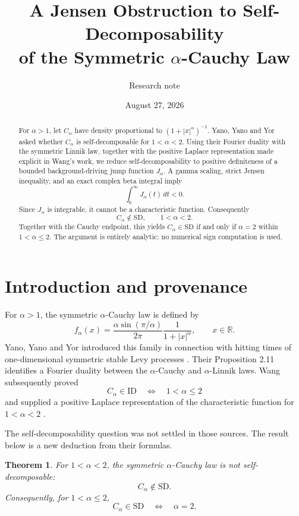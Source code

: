 \documentclass[11pt]{article}
\title{\bfseries A Jensen Obstruction to Self-Decomposability\\
of the Symmetric \texorpdfstring{$\alpha$}{alpha}-Cauchy Law}
\author{Research note}
\date{August 27, 2026}
\newtheorem{theorem}{Theorem}[section]
\theoremstyle{remark}
\newcommand{\R}{\mathbb{R}}
\newcommand{\SD}{\mathrm{SD}}
\newcommand{\ID}{\mathrm{ID}}
\begin{document}
\maketitle

\begin{abstract}
For $\alpha>1$, let $C_\alpha$ have density proportional to
$(1+|x|^\alpha)^{-1}$.  Yano, Yano and Yor asked whether $C_\alpha$
is self-decomposable for $1<\alpha<2$.  Using their Fourier duality
with the symmetric Linnik law, together with the positive Laplace
representation made explicit in Wang's work, we reduce
self-decomposability to positive definiteness of a bounded
background-driving jump function $J_\alpha$.  A gamma scaling,
strict Jensen inequality, and an exact complex beta integral imply
\[
  \int_0^\infty J_\alpha(t)\,dt<0.
\]
Since $J_\alpha$ is integrable, it cannot be a characteristic
function.  Consequently
\[
  C_\alpha\notin\SD,\qquad 1<\alpha<2.
\]
Together with the Cauchy endpoint, this yields
$C_\alpha\in\SD$ if and only if $\alpha=2$ within
$1<\alpha\leq2$.  The argument is entirely analytic; no numerical
sign computation is used.
\end{abstract}

\section{Introduction and provenance}

For $\alpha>1$, the symmetric $\alpha$-Cauchy law is defined by
\begin{equation}\label{eq:density}
 f_\alpha(x)
 =\frac{\alpha\sin(\pi/\alpha)}{2\pi}
  \frac{1}{1+|x|^\alpha},
 \qquad x\in\R.
\end{equation}
Yano, Yano and Yor introduced this family in connection with hitting
times of one-dimensional symmetric stable Levy processes
\cite[Remark 2.9]{YYY2009}.  Their Proposition 2.11 identifies a
Fourier duality between the $\alpha$-Cauchy and $\alpha$-Linnik laws.
Wang subsequently proved
\[
 C_\alpha\in\ID
 \quad\Longleftrightarrow\quad
 1<\alpha\leq2
\]
and supplied a positive Laplace representation of the characteristic
function for $1<\alpha<2$ \cite[Lemma 2.7]{Wang2026}.

The self-decomposability question was not settled in those sources.
The result below is a new deduction from their formulas.

\begin{theorem}\label{thm:main}
For $1<\alpha<2$, the symmetric $\alpha$-Cauchy law is not
self-decomposable:
\[
 C_\alpha\notin\SD.
\]
Consequently, for $1<\alpha\leq2$,
\[
 C_\alpha\in\SD
 \quad\Longleftrightarrow\quad
 \alpha=2.
\]
\end{theorem}
\end{document}
